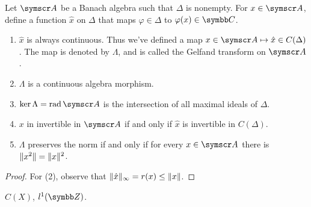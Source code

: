 \begin{proposition}
  Let $\BA A$ be a Banach algebra such that $\Delta$ is nonempty. For $x\in \BA A$, define a function $\hat x$ on $\Delta$ that maps $\varphi\in\Delta$ to $\varphi(x)\in\CC$.
  \begin{enumerate}
    \item $\hat x$ is always continuous. Thus we've defined a map $x\in\BA A\mapsto \hat x\in C(\Delta)$. The map is denoted by $\Lambda$, and is called the Gelfand transform on $\BA A$.
    \item $\Lambda$ is a continuous algebra morphism.
    \item $\ker\Lambda=\RAD\BA A$ is the intersection of all maximal ideals of $\Delta$.
    \item $x$ in invertible in $\BA A$ if and only if $\hat x$ is invertible in $C(\Delta)$.
    \item $\Lambda$ preserves the norm if and only if for every $x\in \BA A$ there is $\Vert x^2\Vert=\Vert x\Vert^2$.
  \end{enumerate}
\end{proposition}

\begin{proof}
  For (2), observe that $\Vert\hat x\Vert_\infty=r(x)\leq \Vert x\Vert$.
\end{proof}

\begin{example}
  $C(X)$, $l^1(\ZZ)$.
\end{example}
